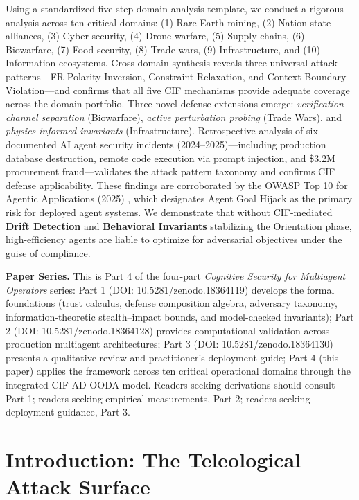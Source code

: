 \documentclass[
]{article}
\begin{document}
Using a standardized five-step domain analysis template, we conduct a
rigorous analysis across ten critical domains: (1) Rare Earth mining,
(2) Nation-state alliances, (3) Cyber-security, (4) Drone warfare, (5)
Supply chains, (6) Biowarfare, (7) Food security, (8) Trade wars, (9)
Infrastructure, and (10) Information ecosystems. Cross-domain synthesis
reveals three universal attack patterns---FR Polarity Inversion,
Constraint Relaxation, and Context Boundary Violation---and confirms
that all five CIF mechanisms provide adequate coverage across the domain
portfolio. Three novel defense extensions emerge: \emph{verification
channel separation} (Biowarfare), \emph{active perturbation probing}
(Trade Wars), and \emph{physics-informed invariants} (Infrastructure).
Retrospective analysis of six documented AI agent security incidents
(2024--2025)---including production database destruction, remote code
execution via prompt injection, and \$3.2M procurement fraud---validates
the attack pattern taxonomy and confirms CIF defense applicability.
These findings are corroborated by the OWASP Top 10 for Agentic
Applications (2025) \cite{owasp2025agentic}, which designates Agent Goal
Hijack as the primary risk for deployed agent systems. We demonstrate
that without CIF-mediated \textbf{Drift Detection} and
\textbf{Behavioral Invariants} stabilizing the Orientation phase,
high-efficiency agents are liable to optimize for adversarial objectives
under the guise of compliance.

\textbf{Paper Series.} This is Part 4 of the four-part \emph{Cognitive
Security for Multiagent Operators} series: Part 1 (DOI:
10.5281/zenodo.18364119) develops the formal foundations (trust
calculus, defense composition algebra, adversary taxonomy,
information-theoretic stealth--impact bounds, and model-checked
invariants); Part 2 (DOI: 10.5281/zenodo.18364128) provides
computational validation across production multiagent architectures;
Part 3 (DOI: 10.5281/zenodo.18364130) presents a qualitative review and
practitioner's deployment guide; Part 4 (this paper) applies the
framework across ten critical operational domains through the integrated
CIF-AD-OODA model. Readers seeking derivations should consult Part 1;
readers seeking empirical measurements, Part 2; readers seeking
deployment guidance, Part 3.

\newpage

\section{Introduction: The Teleological Attack
Surface}\label{introduction-the-teleological-attack-surface}
\end{document}
